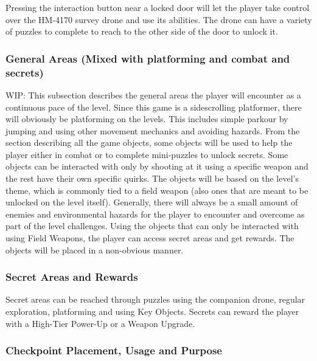 \documentclass[12pt]{article}
\begin{document}
Pressing the interaction button near a locked door will let the player take control over the HM-4170 survey drone and use its abilities. The drone can have a variety of puzzles to complete to reach to the other side of the door to unlock it. 

\subsubsection{General Areas (Mixed with platforming and combat and secrets)}

WIP: This subsection describes the general areas the player will encounter as a continuous pace of the level. Since this game is a sidescrolling platformer, there will obviously be platforming on the levels. This includes simple parkour by jumping and using other movement mechanics and avoiding hazards. From the section describing all the game objects, some objects will be used to help the player either in combat or to complete mini-puzzles to unlock secrets. Some objects can be interacted with only by shooting at it using a specific weapon and the rest have their own specific quirks. The objects will be based on the level's theme, which is commonly tied to a field weapon (also ones that are meant to be unlocked on the level itself). Generally, there will always be a small amount of enemies and environmental hazards for the player to encounter and overcome as part of the level challenges. Using the objects that can only be interacted with using Field Weapons, the player can access secret areas and get rewards. The objects will be placed in a non-obvious manner. 

\subsubsection{Secret Areas and Rewards}

Secret areas can be reached through puzzles using the companion drone, regular exploration, platforming and using Key Objects. Secrets can reward the player with a High-Tier Power-Up or a Weapon Upgrade.

\subsubsection{Checkpoint Placement, Usage and Purpose}
\end{document}
